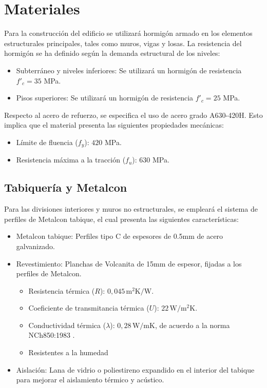 \section{Materiales}

Para la construcción del edificio se utilizará hormigón armado en los elementos estructurales principales, tales como muros, vigas y losas. La resistencia del hormigón se ha definido según la demanda estructural de los niveles:

\begin{itemize}
    \item Subterráneo y niveles inferiores: Se utilizará un hormigón de resistencia $f'_c = 35$ MPa.
    \item Pisos superiores: Se utilizará un hormigón de resistencia $f'_c = 25$ MPa.
\end{itemize}

Respecto al acero de refuerzo, se especifica el uso de acero grado A630-420H. Esto implica que el material presenta las siguientes propiedades mecánicas:
\begin{itemize}
    \item Límite de fluencia ($f_y$): $420$ MPa.
    \item Resistencia máxima a la tracción ($f_u$): $630$ MPa.
\end{itemize}

\subsection{Tabiquería y Metalcon}
Para las divisiones interiores y muros no estructurales, se empleará el sistema de perfiles de Metalcon tabique, el cual presenta las siguientes características:
\begin{itemize}
    \item Metalcon tabique: Perfiles tipo C de espesores de 0.5mm de acero galvanizado. \cite{Cintac:2019}
    \item Revestimiento: Planchas de Volcanita de 15mm de espesor, fijadas a los perfiles de Metalcon. \cite{Volcan:2020}
    \begin{itemize}
        \item Resistencia térmica ($R$): $0,045\,\mathrm{m^2K/W}$.
        \item Coeficiente de transmitancia térmica ($U$): $22\,\mathrm{W/m^2K}$.
        \item Conductividad térmica ($\lambda$): $0,28\,\mathrm{W/mK}$, de acuerdo a la norma NCh850:1983 \cite{NCh850:1983}.
        \item Resistentes a la humedad
    \end{itemize}
    \item Aislación: Lana de vidrio o poliestireno expandido en el interior del tabique para mejorar el aislamiento térmico y acústico.
\end{itemize}

